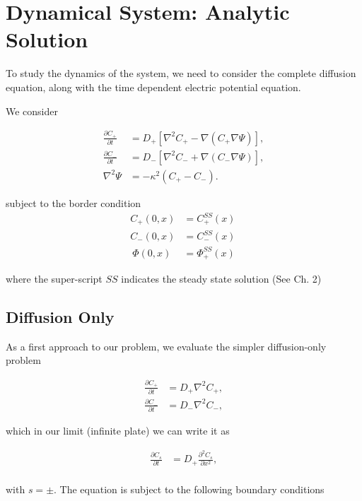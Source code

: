 \section{Dynamical System: Analytic Solution}

To study the dynamics of the system, we need to consider the complete diffusion equation, along with the time dependent electric potential equation.

We consider

\begin{align}
\frac{\partial C_+}{\partial t} &= D_+ \left[\nabla^2 C_+ -  \nabla (C_+ \nabla \Psi) \right] , \\
\frac{\partial C_-}{\partial t} &= D_- \left[\nabla^2 C_- + \nabla (C_- \nabla \Psi) \right], \\
\nabla^2 \Psi &= -\kappa^2 \left(C_+ - C_- \right).
\label{eq:dynamic-system}
\end{align}

subject to the border condition 
\begin{align}
C_+(0, x) & = C^{SS}_+(x)\\
C_-(0, x) & =  C^{SS}_-(x)\\\
\Phi(0, x) &= \Phi^{SS}_+(x)\
\end{align}

where the super-script $SS$ indicates the steady state solution (See Ch. 2)%

\subsection{Diffusion Only}

As a first approach to our problem, we evaluate the simpler diffusion-only problem



\begin{align}
\frac{\partial C_+}{\partial t} &= D_+ \nabla^2 C_+,\\
\frac{\partial C_-}{\partial t} &= D_- \nabla^2 C_-,
\label{eq:diffusion}
\end{align}

which in our limit (infinite plate) we can write it as


\begin{align}
\frac{\partial C_s}{\partial t} &= D_+ \frac{\partial^2 C_s}{\partial x^2},\\
\label{eq:diffusion-1d}
\end{align}

with $s=\pm$. The equation is subject to the following boundary conditions


